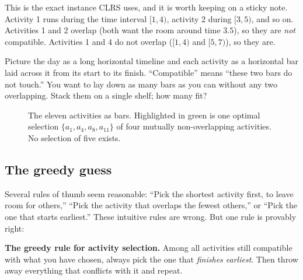 This is the exact instance CLRS uses, and it is worth keeping on a sticky note.
Activity 1 runs during the time interval $[1,4)$, activity 2 during $[3,5)$, and
so on. Activities 1 and 2 overlap (both want the room around time $3.5$), so they
are \emph{not} compatible. Activities 1 and 4 do not overlap ($[1,4)$ and
$[5,7)$), so they are.

\begin{intuitionbox}
Picture the day as a long horizontal timeline and each activity as a horizontal
bar laid across it from its start to its finish. ``Compatible'' means
``these two bars do not touch.'' You want to lay down as many bars as you can
without any two overlapping. Stack them on a single shelf; how many fit?
\end{intuitionbox}

\begin{figure}[h]
\centering
{}
\caption{The eleven activities as bars. Highlighted in green is one optimal
selection $\{a_1, a_4, a_8, a_{11}\}$ of four mutually non-overlapping
activities. No selection of five exists.}
\label{ch16:activity-bars}
\end{figure}

\subsection{The greedy guess}

Several rules of thumb seem reasonable: ``Pick the shortest activity first, to leave room for others,'' ``Pick the activity that overlaps the fewest others,'' or ``Pick the one that starts earliest.'' These intuitive rules are wrong. But one rule is provably right:

\begin{focusbox}
\textbf{The greedy rule for activity selection.} Among all activities still
compatible with what you have chosen, always pick the one that \emph{finishes
earliest}. Then throw away everything that conflicts with it and repeat.
\end{focusbox}

